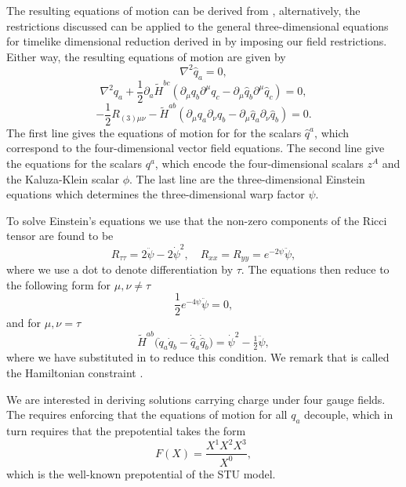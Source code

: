 The resulting equations of motion can be derived from , alternatively, the restrictions discussed can be applied to the general three-dimensional equations for timelike dimensional reduction derived in \cite{Mohaupt:2011aa} by imposing our field restrictions. Either way, the resulting equations of motion are given by
\begin{equation}
\label{eq:eom1}
\nabla^2 \hat{q}_a = 0,
\end{equation}
\begin{equation}
\label{eq:eom2}
\nabla^2 q_a + \frac{1}{2}\partial_a \tilde{H}^{bc}(\partial_\mu q_b \partial^\mu q_c - \partial_\mu \hat{q}_b \partial^\mu \hat{q}_c) = 0,
\end{equation}
\begin{equation}
\label{eq:eom3}
-\frac{1}{2} R_{(3)\mu\nu} - \tilde{H}^{ab}(\partial_\mu q_a \partial_\nu q_b - \partial_\mu \hat{q}_a \partial_\nu \hat{q}_b) =0.
\end{equation}
The first line gives the equations of motion for for the scalars $\hat{q}^a$, which correspond to the four-dimensional vector field equations. The second line give the equations for the scalars $q^a$, which encode the four-dimensional scalars $z^A$ and the Kaluza-Klein scalar $\phi$. The last line are the three-dimensional Einstein equations which determines the three-dimensional warp factor $\psi$.

To solve Einstein's equations we use that the non-zero components of the Ricci tensor are found to be
\begin{equation*}
 R_{\tau \tau} = 2 \ddot{\psi} - 2\dot{\psi}^2, \quad R_{xx} = R_{yy} = e^{-2\psi} \ddot{\psi},
\end{equation*}
where we use a dot to denote differentiation by $\tau$. The equations  then reduce to the following form for $\mu, \nu \neq \tau$
\begin{equation}
\label{eq:eom4}
\frac{1}{2}e^{-4\psi}\ddot{\psi} = 0 ,
\end{equation}
and for $\mu, \nu = \tau$
\begin{equation}
\label{eq:eom5}
\tilde{H}^{ab} \big(\dot{q}_a \dot{q}_b - \dot{\hat{q}}_a \dot{\hat{q}}_b \big) = \dot{\psi}^2 - \tfrac{1}{2} \ddot{\psi},
\end{equation}
where we have substituted in  to reduce this condition. We remark that  is called the Hamiltonian constraint \cite{Errington:2014bta,Dempster:2015}.

We are interested in deriving solutions carrying charge under four gauge fields. The requires enforcing that the equations of motion for all $q_a$ decouple, which in turn requires that the prepotential takes the form
\begin{equation}
        F(X) = \frac{X^1 X^2 X^3}{X^0},
\end{equation}
which is the well-known prepotential of the STU model. 

